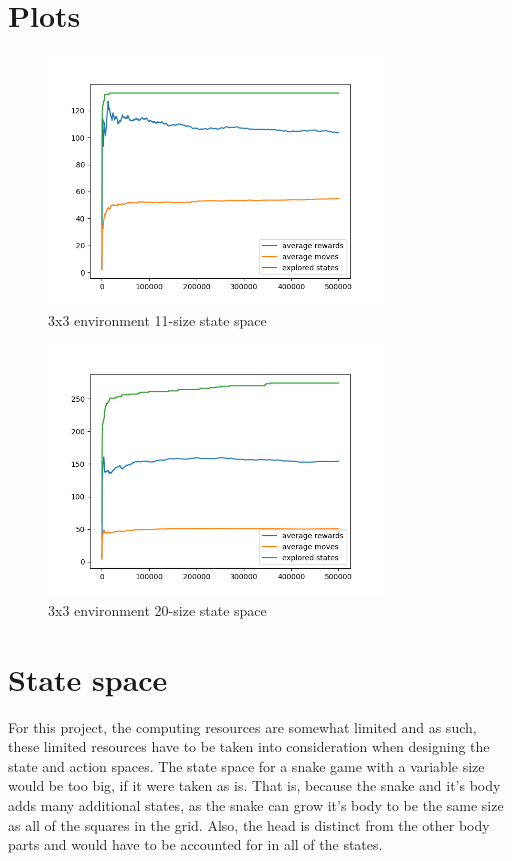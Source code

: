 \documentclass[lettersize,journal]{IEEEtran}
\begin{document}
\section{Plots}
\begin{figure}[!t]
\centering
\includegraphics[width=3.5in]{3_fig.png}
\caption{3x3 environment 11-size state space}
\label{fig1}
\end{figure}

\begin{figure}[!t]
\centering
\includegraphics[width=3.5in]{3-depth_fig.png}
\caption{3x3 environment 20-size state space}
\label{fig1}
\end{figure}

\section{State space}
For this project, the computing resources are somewhat limited and
as such, these limited resources have to be taken into consideration
when designing the state and action spaces.
The state space for a snake game with a variable size would be
too big, if it were taken as is. That is, because the snake and
it's body adds many additional states, as the snake can grow it's body to
be the same size as all of the squares in the grid. Also, the head is distinct
from the other body parts and would have to be accounted for in all of the states.
\end{document}

